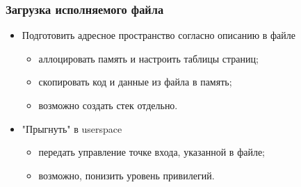 \begin{frame}
\frametitle{Загрузка исполняемого файла}
\begin{itemize}
    \item<1->Подготовить адресное пространство согласно описанию в файле
    \begin{itemize}
        \item<2->аллоцировать память и настроить таблицы страниц;
        \item<3->скопировать код и данные из файла в память;
        \item<4->возможно создать стек отдельно.
    \end{itemize}
    \item<5->"Прыгнуть" в userspace
    \begin{itemize}
        \item<6->передать управление точке входа, указанной в файле;
        \item<7->возможно, понизить уровень привилегий.
    \end{itemize}
\end{itemize}
\end{frame}

